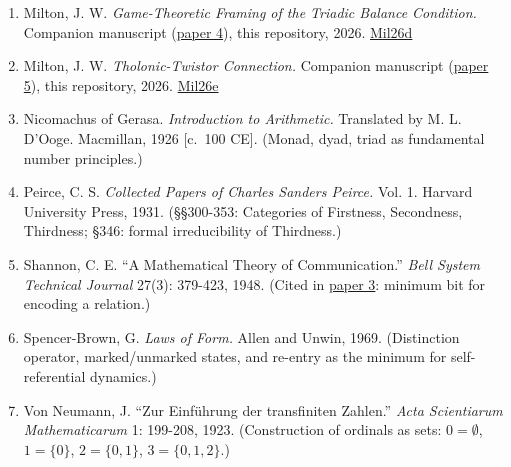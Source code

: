 \documentclass[
  11pt,
  letterpaper,
]{article}
\begin{document}
\begin{enumerate}
{  3}), this repository, 2026.
  \href{https://github.com/baardev/truevalue/blob/main/docnav/Research/papers/3_minimal-recursive-triadic-framework/3_minimal-recursive-triadic-framework.pdf}{Mil26b}
\item
  Milton, J. W. \emph{Game-Theoretic Framing of the Triadic Balance
  Condition.} Companion manuscript
  (\href{https://github.com/baardev/truevalue/blob/main/docnav/Research/papers/4_game-theoretic-triadic-balance/4_game-theoretic-triadic-balance.pdf}{paper
  4}), this repository, 2026.
  \href{https://github.com/baardev/truevalue/blob/main/docnav/Research/papers/4_game-theoretic-triadic-balance/4_game-theoretic-triadic-balance.pdf}{Mil26d}
\item
  Milton, J. W. \emph{Tholonic-Twistor Connection.} Companion manuscript
  (\href{https://github.com/baardev/truevalue/blob/main/docnav/Research/papers/5_tholonic-twistor-connection/5_tholonic-twistor-connection.pdf}{paper
  5}), this repository, 2026.
  \href{https://github.com/baardev/truevalue/blob/main/docnav/Research/papers/5_tholonic-twistor-connection/5_tholonic-twistor-connection.pdf}{Mil26e}
\item
  Nicomachus of Gerasa. \emph{Introduction to Arithmetic.} Translated by
  M. L. D'Ooge. Macmillan, 1926 {[}c.~100 CE{]}. (Monad, dyad, triad as
  fundamental number principles.)
\item
  Peirce, C. S. \emph{Collected Papers of Charles Sanders Peirce.} Vol.
  1. Harvard University Press, 1931. (§§300-353: Categories of
  Firstness, Secondness, Thirdness; §346: formal irreducibility of
  Thirdness.)
\item
  Shannon, C. E. ``A Mathematical Theory of Communication.'' \emph{Bell
  System Technical Journal} 27(3): 379-423, 1948. (Cited in
  \href{https://github.com/baardev/truevalue/blob/main/docnav/Research/papers/3_minimal-recursive-triadic-framework/3_minimal-recursive-triadic-framework.pdf}{paper
  3}: minimum bit for encoding a relation.)
\item
  Spencer-Brown, G. \emph{Laws of Form.} Allen and Unwin, 1969.
  (Distinction operator, marked/unmarked states, and re-entry as the
  minimum for self-referential dynamics.)
\item
  Von Neumann, J. ``Zur Einführung der transfiniten Zahlen.'' \emph{Acta
  Scientiarum Mathematicarum} 1: 199-208, 1923. (Construction of
  ordinals as sets: \(0 = \emptyset\), \(1 = \{0\}\), \(2 = \{0,1\}\),
  \(3 = \{0,1,2\}\).)
\end{enumerate}
\end{document}
